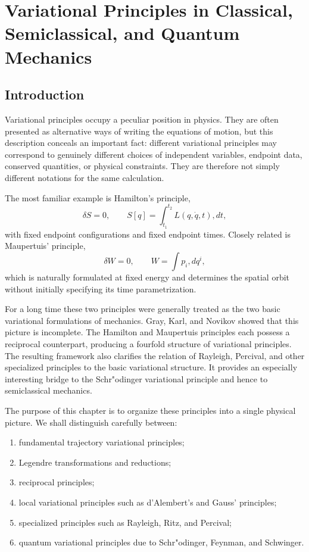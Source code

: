 
\chapter{Variational Principles in Classical, Semiclassical, and Quantum Mechanics}
\label{chap:variational}

\section{Introduction}

Variational principles occupy a peculiar position in physics.  They are often presented as alternative ways of writing the equations of motion, but this description conceals an important fact: different variational principles may correspond to genuinely different choices of independent variables, endpoint data, conserved quantities, or physical constraints.  They are therefore not simply different notations for the same calculation.

The most familiar example is Hamilton's principle,
\begin{equation}
\delta S=0,
\qquad
S[q]=\int_{t_1}^{t_2}L(q,\dot q,t),dt,
\end{equation}
with fixed endpoint configurations and fixed endpoint times.  Closely related is Maupertuis' principle,
\begin{equation}
\delta W=0,
\qquad
W=\int p_i,dq^i,
\end{equation}
which is naturally formulated at fixed energy and determines the spatial orbit without initially specifying its time parametrization.

For a long time these two principles were generally treated as the two basic variational formulations of mechanics.  Gray, Karl, and Novikov showed that this picture is incomplete.  The Hamilton and Maupertuis principles each possess a reciprocal counterpart, producing a fourfold structure of variational principles.  The resulting framework also clarifies the relation of Rayleigh, Percival, and other specialized principles to the basic variational structure.  It provides an especially interesting bridge to the Schr"odinger variational principle and hence to semiclassical mechanics.

The purpose of this chapter is to organize these principles into a single physical picture.  We shall distinguish carefully between:
\begin{enumerate}
\item fundamental trajectory variational principles;
\item Legendre transformations and reductions;
\item reciprocal principles;
\item local variational principles such as d'Alembert's and Gauss' principles;
\item specialized principles such as Rayleigh, Ritz, and Percival;
\item quantum variational principles due to Schr"odinger, Feynman, and Schwinger.
\end{enumerate}

